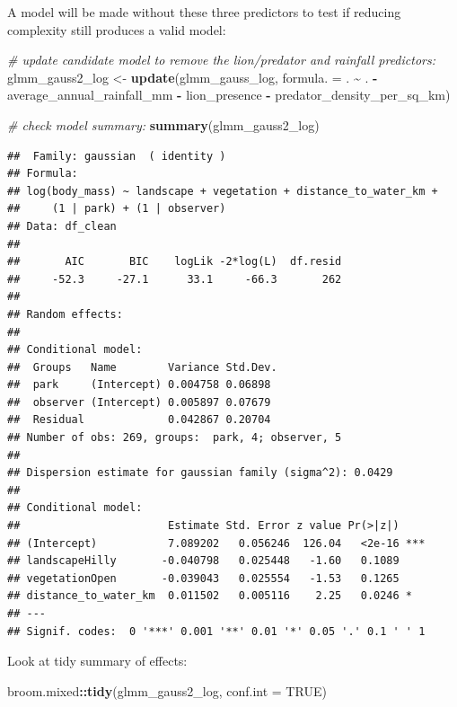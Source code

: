 \documentclass[
]{article}
\newenvironment{Shaded}{\begin{snugshade}}{\end{snugshade}}
\newcommand{\AttributeTok}[1]{\textcolor[rgb]{0.13,0.29,0.53}{#1}}
\newcommand{\CommentTok}[1]{\textcolor[rgb]{0.56,0.35,0.01}{\textit{#1}}}
\newcommand{\ConstantTok}[1]{\textcolor[rgb]{0.56,0.35,0.01}{#1}}
\newcommand{\FunctionTok}[1]{\textcolor[rgb]{0.13,0.29,0.53}{\textbf{#1}}}
\newcommand{\NormalTok}[1]{#1}
\newcommand{\OtherTok}[1]{\textcolor[rgb]{0.56,0.35,0.01}{#1}}
\newcommand{\SpecialCharTok}[1]{\textcolor[rgb]{0.81,0.36,0.00}{\textbf{#1}}}
\begin{document}
A model will be made without these three predictors to test if reducing
complexity still produces a valid model:

\begin{Shaded}
\begin{Highlighting}[]
\CommentTok{\# update candidate model to remove the lion/predator and rainfall predictors:}
\NormalTok{glmm\_gauss2\_log }\OtherTok{\textless{}{-}} \FunctionTok{update}\NormalTok{(glmm\_gauss\_log, }\AttributeTok{formula. =}\NormalTok{ . }\SpecialCharTok{\textasciitilde{}}\NormalTok{ . }\SpecialCharTok{{-}}\NormalTok{ average\_annual\_rainfall\_mm }\SpecialCharTok{{-}}\NormalTok{ lion\_presence }\SpecialCharTok{{-}}\NormalTok{ predator\_density\_per\_sq\_km)}

\CommentTok{\# check model summary:}
 \FunctionTok{summary}\NormalTok{(glmm\_gauss2\_log)}
\end{Highlighting}
\end{Shaded}

\begin{verbatim}
##  Family: gaussian  ( identity )
## Formula:          
## log(body_mass) ~ landscape + vegetation + distance_to_water_km +  
##     (1 | park) + (1 | observer)
## Data: df_clean
## 
##       AIC       BIC    logLik -2*log(L)  df.resid 
##     -52.3     -27.1      33.1     -66.3       262 
## 
## Random effects:
## 
## Conditional model:
##  Groups   Name        Variance Std.Dev.
##  park     (Intercept) 0.004758 0.06898 
##  observer (Intercept) 0.005897 0.07679 
##  Residual             0.042867 0.20704 
## Number of obs: 269, groups:  park, 4; observer, 5
## 
## Dispersion estimate for gaussian family (sigma^2): 0.0429 
## 
## Conditional model:
##                       Estimate Std. Error z value Pr(>|z|)    
## (Intercept)           7.089202   0.056246  126.04   <2e-16 ***
## landscapeHilly       -0.040798   0.025448   -1.60   0.1089    
## vegetationOpen       -0.039043   0.025554   -1.53   0.1265    
## distance_to_water_km  0.011502   0.005116    2.25   0.0246 *  
## ---
## Signif. codes:  0 '***' 0.001 '**' 0.01 '*' 0.05 '.' 0.1 ' ' 1
\end{verbatim}

Look at tidy summary of effects:

\begin{Shaded}
\begin{Highlighting}[]
\NormalTok{broom.mixed}\SpecialCharTok{::}\FunctionTok{tidy}\NormalTok{(glmm\_gauss2\_log, }\AttributeTok{conf.int =} \ConstantTok{TRUE}\NormalTok{)}
\end{Highlighting}
\end{Shaded}
\end{document}
